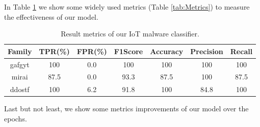 \noindent In Table \ref{tab:IoTVS} we show some widely used metrics (Table \ref{tab:Metrics}) to measure the effectiveness of our model.

\begin{table}[H]
    \centering
    \begin{tabular}{|c|c|c|c|c|c|c|}
        \hline
    \textbf{Family} & \textbf{TPR(\%)} & \textbf{FPR(\%)} & \textbf{F1Score} & \textbf{Accuracy} & \textbf{Precision} & \textbf{Recall} \\
        \hline
        gafgyt & 100 & 0.0 & 100 & 100 & 100 & 100 \\
        mirai & 87.5 & 0.0 & 93.3 & 87.5 & 100 & 87.5 \\
        ddostf & 100 & 6.2 & 91.8 & 100 & 84.8 & 100 \\
        \hline
    \end{tabular}
    \caption{Result metrics of our IoT malware classifier.}
    \label{tab:IoTVS}
\end{table}

\noindent Last but not least, we show some metrics improvements of our model over the epochs.

